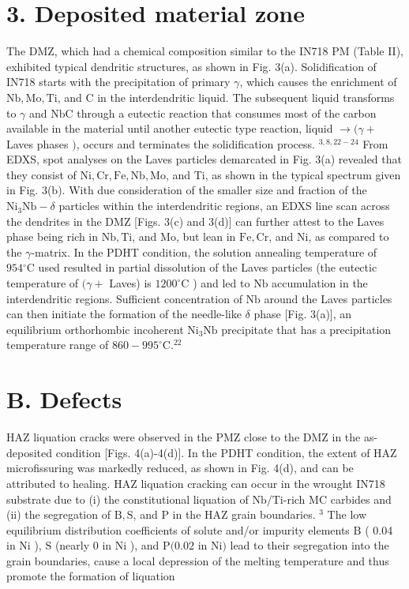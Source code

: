 \documentclass[10pt]{article}
\begin{document}
\section*{3. Deposited material zone}
The DMZ, which had a chemical composition similar to the IN718 PM (Table II), exhibited typical dendritic structures, as shown in Fig. 3(a). Solidification of IN718 starts with the precipitation of primary $\gamma$, which causes the enrichment of $\mathrm{Nb}, \mathrm{Mo}, \mathrm{Ti}$, and $\mathrm{C}$ in the interdendritic liquid. The subsequent liquid transforms to $\gamma$ and $\mathrm{NbC}$ through a eutectic reaction that consumes most of the carbon available in the material until another eutectic type reaction, liquid $\rightarrow(\gamma+$ Laves phases $)$, occurs and terminates the solidification process. ${ }^{3,8,22-24}$ From EDXS, spot analyses on the Laves particles demarcated in Fig. 3(a) revealed that they consist of $\mathrm{Ni}, \mathrm{Cr}, \mathrm{Fe}, \mathrm{Nb}, \mathrm{Mo}$, and $\mathrm{Ti}$, as shown in the typical spectrum given in Fig. 3(b). With due consideration of the smaller size and fraction of the $\mathrm{Ni}_{3} \mathrm{Nb}-\delta$ particles within the interdendritic regions, an EDXS line scan across the dendrites in the DMZ [Figs. 3(c) and 3(d)] can further attest to the Laves phase being rich in $\mathrm{Nb}, \mathrm{Ti}$, and $\mathrm{Mo}$, but lean in $\mathrm{Fe}, \mathrm{Cr}$, and $\mathrm{Ni}$, as compared to the $\gamma$-matrix. In the PDHT condition, the solution annealing temperature of $954{ }^{\circ} \mathrm{C}$ used resulted in partial dissolution of the Laves particles (the eutectic temperature of $(\gamma+$ Laves) is $1200^{\circ} \mathrm{C}$ ) and led to $\mathrm{Nb}$ accumulation in the interdendritic regions. Sufficient concentration of $\mathrm{Nb}$ around the Laves particles can then initiate the formation of the needle-like $\delta$ phase [Fig. 3(a)], an equilibrium orthorhombic incoherent $\mathrm{Ni}_{3} \mathrm{Nb}$ precipitate that has a precipitation temperature range of $860-995^{\circ} \mathrm{C} .{ }^{22}$

\section*{B. Defects}
HAZ liquation cracks were observed in the PMZ close to the DMZ in the as-deposited condition [Figs. 4(a)-4(d)]. In the PDHT condition, the extent of HAZ microfissuring was markedly reduced, as shown in Fig. 4(d), and can be attributed to healing. HAZ liquation cracking can occur in the wrought IN718 substrate due to (i) the constitutional liquation of $\mathrm{Nb} / \mathrm{Ti}$-rich $\mathrm{MC}$ carbides and (ii) the segregation of $\mathrm{B}, \mathrm{S}$, and $\mathrm{P}$ in the HAZ grain boundaries. ${ }^{3}$ The low equilibrium distribution coefficients of solute and/or impurity elements $\mathrm{B}$ ( 0.04 in $\mathrm{Ni}$ ), $\mathrm{S}$ (nearly 0 in $\mathrm{Ni}$ ), and $\mathrm{P}(0.02$ in $\mathrm{Ni})$ lead to their segregation into the grain boundaries, cause a local depression of the melting temperature and thus promote the formation of liquation
\end{document}

